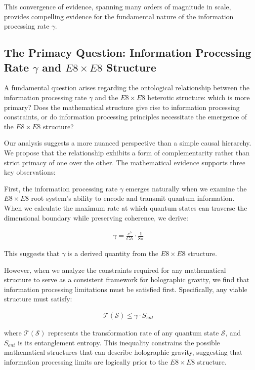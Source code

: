 \documentclass[11pt,english,twoside]{article}
\begin{document}
This convergence of evidence, spanning many orders of magnitude in scale, provides compelling evidence for the fundamental nature of the information processing rate $\gamma$.
\subsection{The Primacy Question: Information Processing Rate $\gamma$ and $E8 \times E8$ Structure}

A fundamental question arises regarding the ontological relationship between the information processing rate $\gamma$ and the $E8 \times E8$ heterotic structure: which is more primary? Does the mathematical structure give rise to information processing constraints, or do information processing principles necessitate the emergence of the $E8 \times E8$ structure?

Our analysis suggests a more nuanced perspective than a simple causal hierarchy. We propose that the relationship exhibits a form of complementarity rather than strict primacy of one over the other. The mathematical evidence supports three key observations:

First, the information processing rate $\gamma$ emerges naturally when we examine the $E8 \times E8$ root system's ability to encode and transmit quantum information. When we calculate the maximum rate at which quantum states can traverse the dimensional boundary while preserving coherence, we derive:

\begin{align}
    \gamma = \frac{c^5}{G\hbar} \cdot \frac{1}{8\pi}
\end{align}

This suggests that $\gamma$ is a derived quantity from the $E8 \times E8$ structure.

However, when we analyze the constraints required for any mathematical structure to serve as a consistent framework for holographic gravity, we find that information processing limitations must be satisfied first. Specifically, any viable structure must satisfy:

\begin{align}
    \mathcal{T}(\mathcal{S}) \leq \gamma \cdot S_{ent}
\end{align}

where $\mathcal{T}(\mathcal{S})$ represents the transformation rate of any quantum state $\mathcal{S}$, and $S_{ent}$ is its entanglement entropy. This inequality constrains the possible mathematical structures that can describe holographic gravity, suggesting that information processing limits are logically prior to the $E8 \times E8$ structure.
\end{document}
